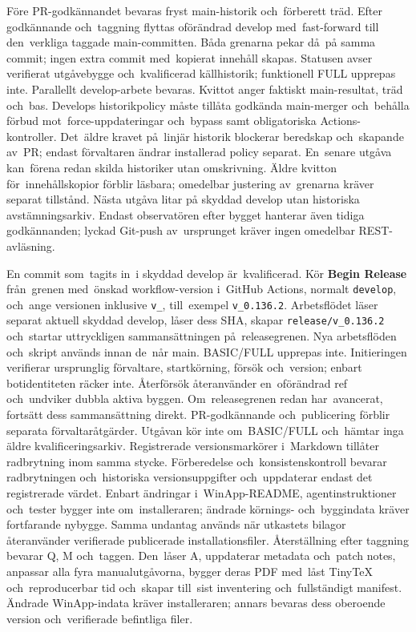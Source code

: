 \documentclass[11pt,a4paper]{article}
\newcommand{\ui}[1]{\textbf{#1}}
\newcommand{\codeword}[1]{\nolinkurl{#1}}
\begin{document}
Före PR-godkännandet bevaras fryst main-historik och~förberett träd.
Efter godkännande och~taggning flyttas oförändrad develop med~fast-forward
till den~verkliga taggade main-committen. Båda grenarna pekar då~på samma
commit;
ingen extra commit med~kopierat innehåll skapas. Statusen avser verifierat
utgåvebygge och~kvalificerad källhistorik; funktionell FULL upprepas inte.
Parallellt develop-arbete bevaras. Kvittot anger faktiskt main-resultat, träd
och~bas. Develops historikpolicy måste tillåta godkända main-merger och~behålla
förbud mot~force-uppdateringar och~bypass samt obligatoriska Actions-kontroller.
Det~äldre kravet på~linjär historik blockerar beredskap och~skapande av~PR;
endast förvaltaren ändrar installerad policy separat. En~senare utgåva
kan~förena
redan skilda historiker utan omskrivning. Äldre kvitton för~innehållskopior
förblir läsbara; omedelbar justering av~grenarna kräver separat tillstånd.
Nästa utgåva litar på
skyddad develop utan historiska avstämningsarkiv. Endast observatören efter
bygget hanterar även tidiga godkännanden; lyckad Git-push av~ursprunget kräver
ingen omedelbar REST-avläsning.

En commit som~tagits in~i skyddad develop är~kvalificerad.
Kör \ui{Begin Release} från~grenen med~önskad workflow-version i~GitHub
Actions, normalt \codeword{develop}, och~ange versionen inklusive
\codeword{v_}, till~exempel \codeword{v_0.136.2}. Arbetsflödet läser separat
aktuell skyddad develop, låser dess SHA, skapar \codeword{release/v_0.136.2}
och~startar uttryckligen sammansättningen på~releasegrenen. Nya arbetsflöden
och~skript används innan de~når main. BASIC/FULL upprepas inte.
Initieringen verifierar ursprunglig förvaltare, startkörning, försök
och~version;
enbart botidentiteten räcker inte. Återförsök återanvänder en~oförändrad ref
och~undviker dubbla aktiva byggen. Om~releasegrenen redan har~avancerat,
fortsätt dess sammansättning direkt. PR-godkännande och~publicering förblir
separata förvaltaråtgärder.
Utgåvan kör inte om~BASIC/FULL och~hämtar inga äldre kvalificeringsarkiv.
Registrerade versionsmarkörer i~Markdown tillåter radbrytning inom samma
stycke. Förberedelse och~konsistenskontroll bevarar radbrytningen och~historiska
versionsuppgifter och~uppdaterar endast det registrerade värdet.
Enbart ändringar i~WinApp-README, agentinstruktioner och~tester bygger inte
om~installeraren; ändrade körnings- och~byggindata kräver fortfarande nybygge.
Samma undantag används när utkastets bilagor återanvänder verifierade
publicerade
installationsfiler. Återställning efter taggning bevarar Q, M och~taggen.
Den~låser A, uppdaterar metadata och~patch notes, anpassar alla fyra
manualutgåvorna, bygger deras PDF med~låst TinyTeX och~reproducerbar tid
och~skapar till~sist inventering och~fullständigt manifest.
Ändrade WinApp-indata kräver installeraren; annars bevaras dess oberoende
version och~verifierade befintliga filer.
\end{document}
